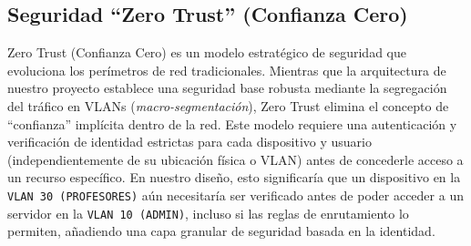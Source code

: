 \subsection{Seguridad ``Zero Trust'' (Confianza Cero)}
Zero Trust (Confianza Cero) es un modelo estratégico de seguridad que evoluciona los perímetros de red tradicionales. Mientras que la arquitectura de nuestro proyecto establece una seguridad base robusta mediante la segregación del tráfico en VLANs (\textit{macro-segmentación}), Zero Trust elimina el concepto de ``confianza'' implícita dentro de la red. Este modelo requiere una autenticación y verificación de identidad estrictas para cada dispositivo y usuario (independientemente de su ubicación física o VLAN) antes de concederle acceso a un recurso específico. En nuestro diseño, esto significaría que un dispositivo en la \texttt{VLAN 30 (PROFESORES)} aún necesitaría ser verificado antes de poder acceder a un servidor en la \texttt{VLAN 10 (ADMIN)}, incluso si las reglas de enrutamiento lo permiten, añadiendo una capa granular de seguridad basada en la identidad.
